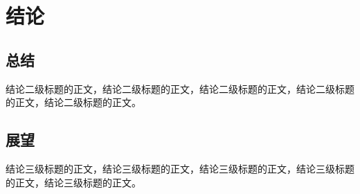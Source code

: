 \section{结论\label{结论}}

\subsection{总结}

结论二级标题的正文，结论二级标题的正文，结论二级标题的正文，结论二级标题的正文，结论二级标题的正文。

\subsection{展望}

结论三级标题的正文，结论三级标题的正文，结论三级标题的正文，结论三级标题的正文，结论三级标题的正文。